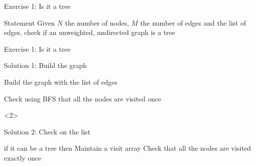 \documentclass{beamer}
\begin{document}
\begin{frame}{Exercise 1: Is it a tree}
  \begin{overlayarea}{\textwidth}{\textheight}
  \begin{block}{Statement}
    Given $N$ the number of nodes, $M$ the number of edges and the list of edges, check if an unweighted, undirected graph is a tree
  \end{block}
  
  
  
  \end{overlayarea}
\end{frame}

\begin{frame}[fragile]{Exercise 1: Is it a tree}

  \begin{code}{Solution 1: Build the graph}
    \begin{PseudoCode}
Build the graph with the list of edges

Check using BFS that all the nodes are visited once
    \end{PseudoCode}
  \end{code}
  
  \begin{uncoverenv}<2>  
  \begin{code}{Solution 2: Check on the list}
    \begin{PseudoCode}
if it can be a tree then
    Maintain a visit array
    Check that all the nodes are visited exactly once
    \end{PseudoCode}
  \end{code}
  \end{uncoverenv}
\end{frame}
\end{document}
